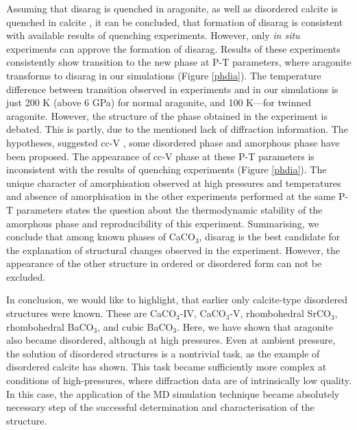 \documentclass[journal=jacsat,manuscript=article]{achemso}
\begin{document}
Assuming that disarag is quenched in aragonite, as well as disordered calcite is quenched in calcite \cite{ishizawa2013}, it can be concluded, that formation of disarag is consistent with available results of quenching experiments.
However, only {\it in situ} experiments can approve the formation of disarag. 
Results of these experiments consistently show transition to the new phase at P-T parameters, where aragonite transforms to disarag in our simulations (Figure \ref{phdia}). 
The temperature difference between transition observed in experiments  \cite{litasov2017, suito2001} and in our simulations is just 200 K (above 6 GPa) for normal aragonite, and 100 K---for twinned aragonite.
However, the structure of the phase obtained in the experiment is debated.
This is partly, due to the mentioned lack of diffraction information.
The hypotheses, suggested cc-V \cite{suito2001}, some disordered phase \cite{litasov2017} and amorphous phase \cite{hou2019_amorph} have been proposed.
The appearance of cc-V phase at these P-T parameters is inconsistent with the results of quenching experiments (Figure \ref{phdia}).
The unique character of amorphisation observed at high pressures and temperatures and absence of amorphisation in the other experiments performed at the same P-T parameters \cite{litasov2017,suito2001} states the question about the thermodynamic stability of the amorphous phase and  reproducibility of this experiment.
Summarising, we conclude that among known phases of CaCO$_3$, disarag is the best candidate for the explanation of structural changes observed in the experiment.
However, the appearance of the other structure in ordered or disordered form can not be excluded.

In conclusion, we would like to highlight, that earlier only calcite-type disordered structures were known. 
These are CaCO$_3$-IV, CaCO$_3$-V, rhombohedral SrCO$_3$, rhombohedral BaCO$_3$, and cubic BaCO$_3$.
Here, we have shown that aragonite also became disordered, although at high pressures.
Even at ambient pressure, the solution of disordered structures is a nontrivial task, as the example of disordered calcite has shown.
This task became sufficiently more complex at conditions of high-pressures, where diffraction data are of intrinsically low quality.
In this case, the application of the MD simulation technique became absolutely necessary step of the successful determination and characterisation of the structure.
\end{document}
